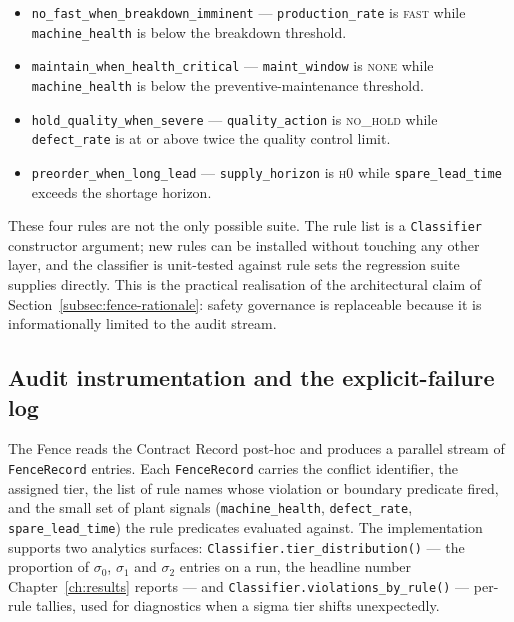 \begin{itemize}[leftmargin=1.4em,itemsep=0.15em]
  \item \texttt{no\_fast\_when\_breakdown\_imminent} ---
    \texttt{production\_rate} is \textsc{fast} while
    \texttt{machine\_health} is below the breakdown threshold.
  \item \texttt{maintain\_when\_health\_critical} ---
    \texttt{maint\_window} is \textsc{none} while
    \texttt{machine\_health} is below the preventive-maintenance
    threshold.
  \item \texttt{hold\_quality\_when\_severe} ---
    \texttt{quality\_action} is \textsc{no\_hold} while
    \texttt{defect\_rate} is at or above twice the quality control limit.
  \item \texttt{preorder\_when\_long\_lead} ---
    \texttt{supply\_horizon} is \textsc{h0} while
    \texttt{spare\_lead\_time} exceeds the shortage horizon.
\end{itemize}

These four rules are not the only possible suite. The rule list is a
\texttt{Classifier} constructor argument; new rules can be installed
without touching any other layer, and the classifier is unit-tested
against rule sets the regression suite supplies directly. This is the
practical realisation of the architectural claim of
Section~\ref{subsec:fence-rationale}: safety governance is replaceable
because it is informationally limited to the audit stream.

\subsection{Audit instrumentation and the explicit-failure log}

The Fence reads the Contract Record post-hoc and produces a parallel
stream of \texttt{FenceRecord} entries. Each \texttt{FenceRecord}
carries the conflict identifier, the assigned tier, the list of rule
names whose violation or boundary predicate fired, and the small set
of plant signals (\texttt{machine\_health}, \texttt{defect\_rate},
\texttt{spare\_lead\_time}) the rule predicates evaluated against. The
implementation supports two analytics surfaces:
\texttt{Classifier.tier\_distribution()} --- the proportion of
$\sigma_0$, $\sigma_1$ and $\sigma_2$ entries on a run, the headline
number Chapter~\ref{ch:results} reports --- and
\texttt{Classifier.violations\_by\_rule()} --- per-rule tallies, used
for diagnostics when a sigma tier shifts unexpectedly.

